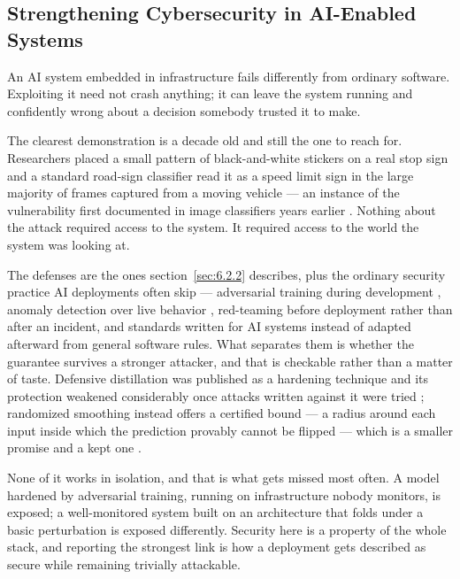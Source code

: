 \subsection{Strengthening Cybersecurity in AI-Enabled Systems}
\label{sec:9.2.2}
An AI system embedded in infrastructure fails differently from ordinary software. Exploiting it need not crash anything; it can leave the system running and confidently wrong about a decision somebody trusted it to make.

The clearest demonstration is a decade old and still the one to reach for. Researchers placed a small pattern of black-and-white stickers on a real stop sign and a standard road-sign classifier read it as a speed limit sign in the large majority of frames captured from a moving vehicle \autocite{eykholt2018robust} — an instance of the vulnerability first documented in image classifiers years earlier \autocite{szegedy2013intriguing}. Nothing about the attack required access to the system. It required access to the world the system was looking at.

The defenses are the ones section~\ref{sec:6.2.2} describes, plus the ordinary security practice AI deployments often skip — adversarial training during development \autocite{goodfellow2014explaining}, anomaly detection over live behavior \autocite{darktrace2014enterprise}, red-teaming before deployment rather than after an incident, and standards written for AI systems instead of adapted afterward from general software rules. What separates them is whether the guarantee survives a stronger attacker, and that is checkable rather than a matter of taste. Defensive distillation was published as a hardening technique and its protection weakened considerably once attacks written against it were tried \autocite{carlini2016defensive}; randomized smoothing instead offers a certified bound — a radius around each input inside which the prediction provably cannot be flipped — which is a smaller promise and a kept one \autocite{cohen2019certified}.

None of it works in isolation, and that is what gets missed most often. A model hardened by adversarial training, running on infrastructure nobody monitors, is exposed; a well-monitored system built on an architecture that folds under a basic perturbation is exposed differently. Security here is a property of the whole stack, and reporting the strongest link is how a deployment gets described as secure while remaining trivially attackable.
